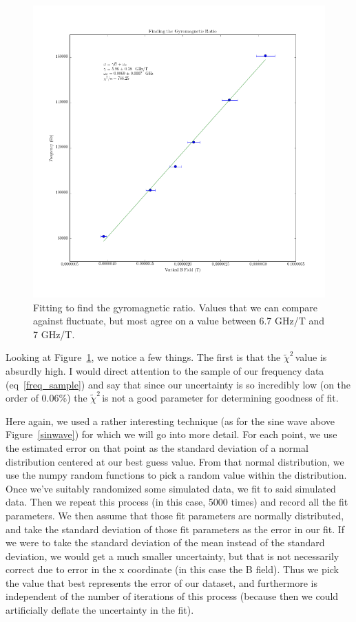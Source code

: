 \documentclass{article}
\newcommand{\redchi}{$\tilde{\chi}^2\,$}
\begin{document}
    \begin{figure}[!htb]
      \centering
      \includegraphics[scale=.5]{../plots/gyromagnetic_ratio_fit.png}
      \caption{Fitting to find the gyromagnetic ratio.  Values that we can compare against fluctuate, but most agree on a value between 6.7 GHz/T and 7 GHz/T.}
      \label{gyromagnetic}
    \end{figure}

    Looking at Figure~\ref{gyromagnetic}, we notice a few things.  The first is that the \redchi value is absurdly high.  I would direct attention to the sample of our frequency data (eq~\ref{freq_sample}) and say that since our uncertainty is so incredibly low (on the order of 0.06\%) the \redchi is not a good parameter for determining goodness of fit.

    \hspace{.25cm}

    Here again, we used a rather interesting technique (as for the sine wave above Figure~\ref{sinwave}) for which we will go into more detail.  For each point, we use the estimated error on that point as the standard deviation of a normal distribution centered at our best guess value.  From that normal distribution, we use the numpy random functions to pick a random value within the distribution.  Once we've suitably randomized some simulated data, we fit to said simulated data.  Then we repeat this process (in this case, 5000 times) and record all the fit parameters.  We then assume that those fit parameters are normally distributed, and take the standard deviation of those fit parameters as the error in our fit.  If we were to take the standard deviation of the mean instead of the standard deviation, we would get a much smaller uncertainty, but that is not necessarily correct due to error in the x coordinate (in this case the B field).  Thus we pick the value that best represents the error of our dataset, and furthermore is independent of the number of iterations of this process (because then we could artificially deflate the uncertainty in the fit).
\end{document}
